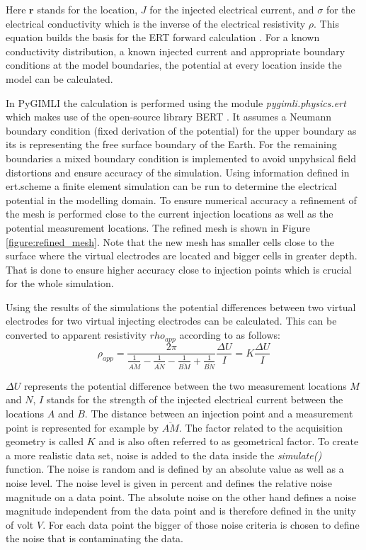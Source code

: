 Here $\textbf{r}$ stands for the location, $J$ for the injected electrical current, and $\sigma$ for the electrical conductivity which is the inverse of the electrical resistivity $\rho$. This equation builds the basis for the ERT forward calculation \citep{johnson2015accurate}. For a known conductivity distribution, a known injected current and appropriate boundary conditions at the model boundaries, the potential at every location inside the model can be calculated. 

In PyGIMLI the calculation is performed using the module \textit{pygimli.physics.ert} which makes use of the open-source library BERT \citep{gunther20063, rucker20063}. It assumes a Neumann boundary condition (fixed derivation of the potential) for the upper boundary as its is representing the free surface boundary of the Earth. For the remaining boundaries a mixed boundary condition is implemented to avoid unpyhsical field distortions and ensure accuracy of the simulation. 
Using information defined in ert.scheme a finite element simulation can be run to determine the electrical potential in the modelling domain. To ensure numerical accuracy a refinement of the mesh is performed close to the current injection locations as well as the potential measurement locations. The refined mesh is shown in Figure \ref{figure:refined_mesh}. Note that the new mesh has smaller cells close to the surface where the virtual electrodes are located and bigger cells in greater depth. That is done to ensure higher accuracy close to injection points which is crucial for the whole simulation.

Using the results of the simulations the potential differences between two virtual electrodes for two virtual injecting electrodes can be calculated. This can be converted to apparent resistivity $rho_{app}$ according to \citet{kearey2002introduction} as follows:
\begin{equation}
    \rho_{app} = \frac{2\pi}{\frac{1}{\overline{AM}}-\frac{1}{\overline{AN}}-\frac{1}{\overline{BM}}+\frac{1}{\overline{BN}}} \frac{\Delta U}{I} = K \frac{\Delta U}{I}
    \label{Eq:rho_app}
\end{equation}

$\Delta U$ represents the potential difference between the two measurement locations $M$ and $N$, $I$ stands for the strength of the injected electrical current between the locations $A$ and $B$. The distance between an injection point and a measurement point is represented for example by $\overline{AM}$. The factor related to the acquisition geometry is called $K$ and is also often referred to as geometrical factor. To create a more realistic data set, noise is added to the data inside the \textit{simulate()} function. The noise is random and is defined by an absolute value as well as a noise level. The noise level is given in percent and defines the relative noise magnitude on a data point. The absolute noise on the other hand defines a noise magnitude independent from the data point and is therefore defined in the unity of volt $V$. For each data point the bigger of those noise criteria is chosen to define the noise that is contaminating the data.

